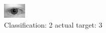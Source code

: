 \begin{figure}[h!]
\begin{center}
\includegraphics[width=0.60\columnwidth]{figures/ID643_class_2_target_3.png}
\end{center}
\caption{ Classification: 2 actual target: 3}
\label{fig:ID643_class_2_target_3}
\end{figure}
